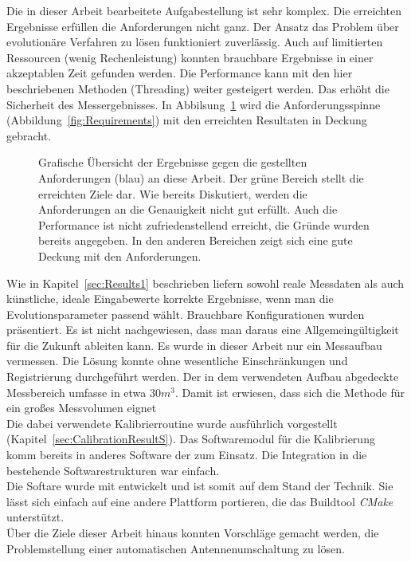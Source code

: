 %
Die in dieser Arbeit bearbeitete Aufgabestellung ist sehr komplex. Die erreichten Ergebnisse erfüllen die Anforderungen nicht ganz. Der Ansatz das Problem über evolutionäre Verfahren zu lösen funktioniert zuverlässig. Auch auf limitierten Ressourcen (wenig Rechenleistung) konnten brauchbare Ergebnisse in einer akzeptablen Zeit gefunden werden. Die Performance kann mit den hier beschriebenen Methoden (Threading) weiter gesteigert werden. Das erhöht die Sicherheit des Messergebnisses. In Abbilsung~\ref{fig:Requirements_reached} wird die Anforderungsspinne (Abbildung~\ref{fig:Requirements}) mit den erreichten Resultaten in Deckung gebracht.\\
%
\begin{figure}[ht]
         \centering
         \caption[Anforderungsspinne]{ Grafische Übersicht der Ergebnisse gegen die gestellten Anforderungen (blau) an diese Arbeit. Der grüne Bereich stellt die erreichten Ziele dar. Wie bereits Diskutiert, werden die Anforderungen an die Genauigkeit nicht gut erfüllt. Auch die Performance ist nicht zufriedenstellend erreicht, die Gründe wurden bereits angegeben. In den anderen Bereichen zeigt sich eine gute Deckung mit den Anforderungen. }
         \vspace{2mm}
         \label{fig:Requirements_reached}
         
         \vspace{5mm}
\end{figure}
%

Wie in Kapitel~\ref{sec:Results1} beschrieben liefern sowohl reale Messdaten als auch künstliche, ideale Eingabewerte korrekte Ergebnisse, wenn man die Evolutionsparameter passend wählt. Brauchbare Konfigurationen wurden präsentiert. Es ist nicht nachgewiesen, dass man daraus eine Allgemeingültigkeit für die Zukunft ableiten kann. Es wurde in dieser Arbeit nur ein Messaufbau vermessen. Die Lösung konnte ohne wesentliche Einschränkungen und Registrierung durchgeführt werden. Der in dem verwendeten Aufbau abgedeckte Messbereich umfasse in etwa $30 m^3$. Damit ist erwiesen, dass sich die Methode für ein großes Messvolumen eignet\\
%

Die dabei verwendete Kalibrierroutine wurde ausführlich vorgestellt (Kapitel~\ref{sec:CalibrationResultS}). Das Softwaremodul für die Kalibrierung komm bereits in anderes Software der \amedogmbh zum Einsatz. Die Integration in die bestehende Softwarestrukturen war einfach. \\
%

Die Softare wurde mit  entwickelt und ist somit auf dem Stand der Technik. Sie lässt sich einfach auf eine andere Plattform portieren, die das Buildtool \textit{CMake} unterstützt. \\

%
Über die Ziele dieser Arbeit hinaus konnten Vorschläge gemacht werden, die Problemstellung einer automatischen Antennenumschaltung zu lösen. 